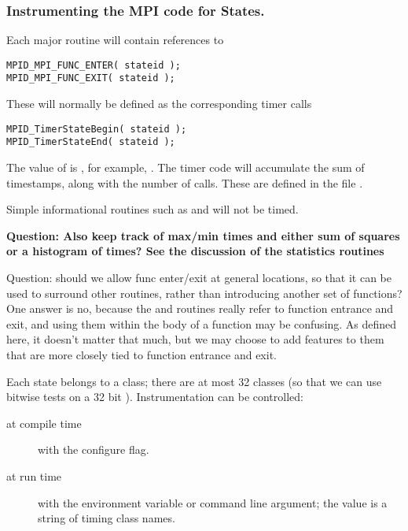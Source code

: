 \documentclass{article}
\begin{document}
\subsubsection{Instrumenting the MPI code for States.}
Each major routine will contain references to 
\begin{verbatim}
MPID_MPI_FUNC_ENTER( stateid );
MPID_MPI_FUNC_EXIT( stateid );
\end{verbatim}
These will normally be defined as the corresponding timer calls
\begin{verbatim}
MPID_TimerStateBegin( stateid );
MPID_TimerStateEnd( stateid );
\end{verbatim}
The value of  is , for example,
.  The timer code will accumulate the sum of
timestamps, along with the number of calls.  These are defined in the file
. 

Simple informational routines such as  and
 will not be timed.

\textbf{Question: Also keep track of max/min times and either sum of squares
  or a histogram of times?  See the discussion of the statistics routines}

Question: should we allow func enter/exit at general
locations, so that it can be used to surround other routines, rather
than introducing another set of functions?  One answer is no, because
the  and  routines really refer
to function entrance and exit, and using them within the body of a
function may be confusing.  As defined here, it doesn't matter that
much, but we may choose to add features to them that are more closely
tied to function entrance and exit.

Each state belongs to a class; there are at most 32 classes (so that we can use
bitwise tests on a 32 bit ).  Instrumentation can be
controlled:
\begin{description}
\item[at compile time]with the  configure flag.
\item[at run time]with the  environment variable or
   command line argument; the value is a string of timing
  class names.
\end{description}
\end{document}
